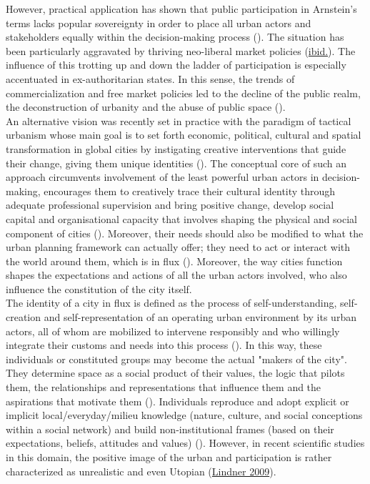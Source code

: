 \documentclass[11pt]{report}
\begin{document}
{{{However, practical application has shown that public participation in Arnstein’s terms lacks popular sovereignty in order to place all urban actors and stakeholders equally within the decision-making process
(\href{Mouffe}{\citealt{mouffe_which_2002}}).
The situation has been particularly aggravated by thriving neo-liberal market policies (\href{Mouffe}{ibid.}).
The influence of this trotting up and down the ladder of participation is especially accentuated in ex-authoritarian states.
In this sense, the trends of commercialization and free market policies led to the decline of the public realm, the deconstruction of urbanity and the abuse of public space
(\href{Hirt}{\citealt{hirt_landscapes_2008}}).
\\

An alternative vision was recently set in practice with the paradigm of tactical urbanism whose main goal is to set forth economic, political, cultural and spatial transformation in global cities by instigating creative interventions that guide their change, giving them unique identities
(\href{Lydon}{\citealt{lydon_tactical_2012}}).
The conceptual core of such an approach circumvents involvement of the least powerful urban actors in decision-making, encourages them to creatively trace their cultural identity through adequate professional supervision and bring positive change, develop social capital and organisational capacity that involves shaping the physical and social component of cities 
(\href{Bolay}{\citealt{bolay_planning_1996}}).
Moreover, their needs should also be modified to what the urban planning framework can actually offer; they need to act or interact with the world around them, which is in flux
(\href{Harvey}{\citealt{harvey_condition_2003}}).
Moreover, the way cities function shapes the expectations and actions of all the urban actors involved, who also influence the constitution of the city itself.
\\

The identity of a city in flux is defined as the process of self-understanding, self-creation and self-representation of an operating urban environment by its urban actors, all of whom are mobilized to intervene responsibly and who willingly integrate their customs and needs into this process
(\href{Bolay}{\citealt{bolay_urban_2005}}).
In this way, these individuals or constituted groups may become the actual "makers of the city".
They determine space as a social product of their values, the logic that pilots them, the relationships and representations that influence them and the aspirations that motivate them (\href{Lefebvre}{\citealt{lefebvre_production_1974}}).
Individuals reproduce and adopt explicit or implicit local/everyday/milieu knowledge (nature, culture, and social conceptions within a social network) and build non-institutional frames (based on their expectations, beliefs, attitudes and values) (\href{Getimis}{\citealt{getimis_comparing_2012}}).
However, in recent scientific studies in this domain, the  positive image of the urban and participation is rather characterized as unrealistic and even Utopian
(\href{Lindner}{Lindner 2009}).
\\

}}}
\end{document}
